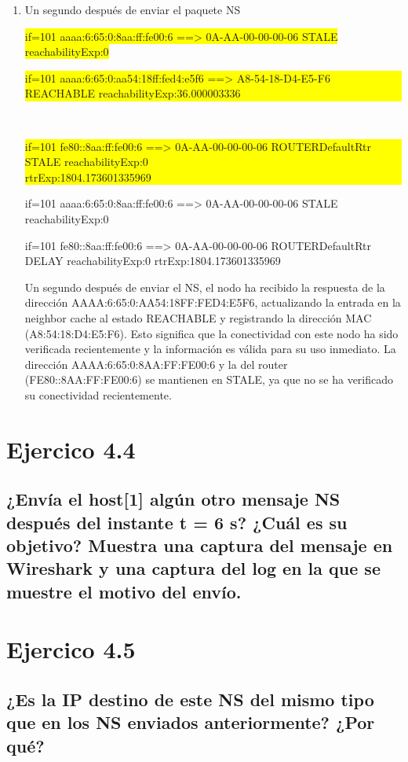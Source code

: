 \begin{enumerate}
    \item Un segundo después de enviar el paquete NS
    
    \colorbox{yellow}{%
            if=101 aaaa:6:65:0:8aa:ff:fe00:6 ==> 0A-AA-00-00-00-06 STALE reachabilityExp:0%
    }\\
    \colorbox{yellow}{%
        \parbox{\linewidth}{%
            if=101 aaaa:6:65:0:aa54:18ff:fed4:e5f6 ==> A8-54-18-D4-E5-F6 REACHABLE reachabilityExp:36.000003336%
        }
    }\\
    \colorbox{yellow}{%
        \parbox{\linewidth}{%
            if=101 fe80::8aa:ff:fe00:6 ==> 0A-AA-00-00-00-06 ROUTERDefaultRtr STALE reachabilityExp:0\\
            rtrExp:1804.173601335969%
        }
    }

    if=101 aaaa:6:65:0:8aa:ff:fe00:6 ==> 0A-AA-00-00-00-06 STALE reachabilityExp:0

    if=101 fe80::8aa:ff:fe00:6 ==> 0A-AA-00-00-00-06 ROUTERDefaultRtr DELAY reachabilityExp:0 rtrExp:1804.173601335969

    Un segundo después de enviar el NS, el nodo ha recibido la respuesta de la dirección AAAA:6:65:0:AA54:18FF:FED4:E5F6, actualizando la entrada en la neighbor cache al estado REACHABLE y registrando la dirección MAC (A8:54:18:D4:E5:F6). Esto significa que la conectividad con este nodo ha sido verificada recientemente y la información es válida para su uso inmediato. La dirección AAAA:6:65:0:8AA:FF:FE00:6 y la del router (FE80::8AA:FF:FE00:6) se mantienen en STALE, ya que no se ha verificado su conectividad recientemente.

\end{enumerate}



\section{Ejercico 4.4}
\subsection{¿Envía el host[1] algún otro mensaje NS después del instante t = 6 s? ¿Cuál es su objetivo? Muestra una captura del mensaje en Wireshark y una captura del log en la que se muestre el motivo del envío.}


\section{Ejercico 4.5}
\subsection{¿Es la IP destino de este NS del mismo tipo que en los NS enviados anteriormente? ¿Por qué?}


